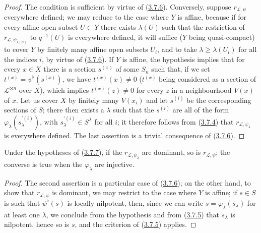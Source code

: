 \begin{proof}
The condition is sufficient by virtue of
(\hyperref[II.3.7.6]{3.7.6}). Conversely, suppose
$r_{\mathcal{L},\psi}$ everywhere defined; we may reduce to the case where $Y$
is affine, because if for every affine open subset $U\subset Y$ there exists
$\lambda(U)$ such that the restriction of $r_{\mathcal{L},\psi_{\lambda(U)}}$
to $q^{-1}(U)$ is everywhere defined, it will suffice ($Y$ being
quasi-compact) to cover $Y$ by finitely many affine open subsets $U_i$, and
to take $\lambda\geq\lambda(U_i)$ for all the indices $i$, by virtue of
(\hyperref[II.3.7.6]{3.7.6}). If $Y$ is affine, the hypothesis implies that
for every $x\in X$ there is a section $s^{(x)}$ of some $S_n$ such that, if
we set $t^{(x)}=\psi^\flat(s^{(x)})$, we have $t^{(x)}(x)\neq0$
($t^{(x)}$ being considered as a section of $\mathcal{L}^{\otimes n}$
over $X$), which implies $t^{(x)}(z)\neq0$ for every $z$ in a
neighbourhood $V(x)$ of $x$. Let us cover $X$ by finitely many $V(x_i)$ and
let $s^{(i)}$ be the corresponding sections of $S$; there then exists a
$\lambda$ such that the $s^{(i)}$ are all of the form
$\varphi_\lambda(s_\lambda^{\prime(i)})$, with $s_\lambda^{\prime(i)}\in S^\lambda$ for
all $i$; it therefore follows from (\hyperref[II.3.7.4]{3.7.4}) that
$r_{\mathcal{L},\psi_\lambda}$ is everywhere defined. The last assertion is a
trivial consequence of (\hyperref[II.3.7.6]{3.7.6}).
\end{proof}

\begin{corollary}[3.7.8]
\label{II.3.7.8}
Under the hypotheses of \textup{(\hyperref[II.3.7.7]{3.7.7})}, if the
$r_{\mathcal{L},\psi_\lambda}$ are dominant, so is
$r_{\mathcal{L},\psi}$; the converse is true when the
$\varphi_\lambda$ are injective.
\end{corollary}


\begin{proof}
The second assertion is a particular case of
(\hyperref[II.3.7.6]{3.7.6}); on the other hand, to show that
$r_{\mathcal{L},\psi}$ is dominant, we may restrict to the case where $Y$ is
affine; if $s\in S$ is such that $\psi^\flat(s)$ is locally
nilpotent, then, since we can write $s=\varphi_\lambda(s_\lambda)$ for at
least one $\lambda$, we conclude from the hypothesis and from
(\hyperref[II.3.7.5]{3.7.5}) that $s_\lambda$ is nilpotent, hence so is $s$,
and the criterion of (\hyperref[II.3.7.5]{3.7.5}) applies.
\end{proof}

